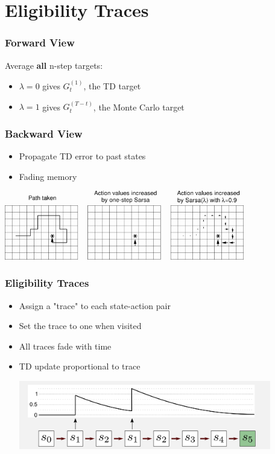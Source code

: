 \documentclass{beamer}
\begin{document}


\section{Eligibility Traces}

\frame{\tableofcontents[currentsection]}

\begin{frame}
\frametitle{Forward View}
Average \textbf{all} n-step targets:
\begin{itemize}
\item<3> $\lambda=0$ gives $G_t^{(1)}$, the TD target
\item<4> $\lambda=1$ gives $G_t^{(T-t)}$, the Monte Carlo target
\end{itemize}
\end{frame}

\begin{frame}
\frametitle{Backward View}
\begin{itemize}
\item Propagate TD error to past states
\item Fading memory
\end{itemize}

\vfill
\centering
\bigskip\bigskip
\includegraphics[height=3cm]{images/lambda}

\end{frame}
\begin{frame}
\frametitle{Eligibility Traces}
\begin{itemize}
\item Assign a "trace" to each state-action pair
\item Set the trace to one when visited
\item All traces fade with time
\item TD update proportional to trace

\vfill
\centering
\bigskip\bigskip
\includegraphics[height=3cm]{images/trace}
\end{itemize}
\end{frame}
\end{document}
